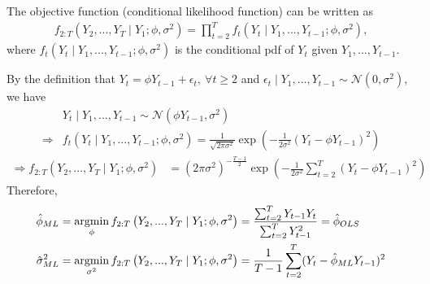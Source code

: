 \documentclass[11pt]{elegantbook}
\newcommand{\argmin}{\operatornamewithlimits{argmin}}
\begin{document}
\begin{definition}
    The objective function (conditional likelihood function) can be written as
    \begin{equation}
        \begin{aligned}
            f_{2:T}\left(Y_2,...,Y_T\mid Y_1;\phi,\sigma^2\right)=\prod_{t=2}^Tf_t\left(Y_t\mid Y_1,...,Y_{t-1};\phi,\sigma^2\right),
        \end{aligned}
        \nonumber
    \end{equation}
    where $f_t\left(Y_t\mid Y_1,...,Y_{t-1};\phi,\sigma^2\right)$ is the conditional pdf of $Y_t$ given $Y_1,...,Y_{t-1}$.
\end{definition}
By the definition that $Y_t=\phi Y_{t-1}+\epsilon_t,\ \forall t\geq 2$ and $\epsilon_t\mid Y_{1},...,Y_{t-1}\sim \mathcal{N}(0,\sigma^2)$, we have
\begin{equation}
    \begin{aligned}
        &Y_t\mid Y_1,...,Y_{t-1}\sim \mathcal{N}(\phi Y_{t-1},\sigma^2)\\
        \Rightarrow& f_t\left(Y_t\mid Y_1,...,Y_{t-1};\phi,\sigma^2\right)=\frac{1}{\sqrt{2\pi\sigma^2}}\exp\left(-\frac{1}{2\sigma^2}\left(Y_t-\phi Y_{t-1}\right)^2\right)
    \end{aligned}
    \nonumber
\end{equation}
\begin{equation}
    \begin{aligned}
        \Rightarrow f_{2:T}\left(Y_2,...,Y_T\mid Y_1;\phi,\sigma^2\right)%
        &=\left(2\pi\sigma^2\right)^{-\frac{T-1}{2}}\exp\left(-\frac{1}{2\sigma^2}\sum_{t=2}^T\left(Y_t-\phi Y_{t-1}\right)^2\right)
    \end{aligned}
    \nonumber
\end{equation}
Therefore,
\begin{equation}
    \begin{aligned}
        \hat{\phi}_{ML}&=\argmin_{\phi} f_{2:T}\left(Y_2,...,Y_T\mid Y_1;\phi,\sigma^2\right)=\frac{\sum_{t=2}^TY_{t-1}Y_t}{\sum_{t=2}^T Y_{t-1}^2}=\hat{\phi}_{OLS}\\
        \hat{\sigma}^2_{ML}&=\argmin_{\sigma^2} f_{2:T}\left(Y_2,...,Y_T\mid Y_1;\phi,\sigma^2\right)=\frac{1}{T-1}\sum_{t=2}^T (Y_t-\hat{\phi}_{ML}Y_{t-1})^2
    \end{aligned}
    \nonumber
\end{equation}
\end{document}
